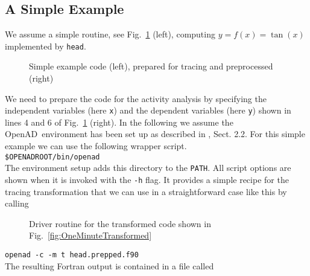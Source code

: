 \documentclass{article}
\newcommand{\openad}{OpenAD}
\newcommand{\reffig}[1]{{Fig.~\ref{#1}}}
\begin{document}
\subsection{A Simple Example}
We assume a simple routine, see \reffig{fig:OneMinute} (left), computing $y=f(x)=\tan(x)$ implemented by \lstinline{head}.
\begin{figure}
\begin{minipage}[t]{.48\linewidth}

\end{minipage}
\begin{minipage}[t]{.48\linewidth}

\end{minipage}
\caption{Simple example code (left), prepared for tracing and preprocessed (right)}\label{fig:OneMinute}
\end{figure}
We need to prepare the code for the activity analysis by specifying the independent variables
(here \lstinline{x}) and the dependent variables 
(here \lstinline{y}) shown in lines 4 and 6 of \reffig{fig:OneMinute} (right).
In the following we assume the \openad\ environment has been set up as 
described in \cite{userManual}, Sect. 2.2.
For this simple example we can use the following wrapper script.\\[1ex]
\hspace*{.3cm}\lstinline{$OPENADROOT/bin/openad}\\[1ex] %
The environment setup adds this directory to the \lstinline{PATH}.
All script options are shown when it is invoked with the \lstinline{-h} flag. 
It provides a simple recipe for the tracing transformation that we can use in 
a straightforward case like this by calling %
\begin{wrapfigure}[25]{r}{.5\textwidth}
\begin{minipage}{.98\linewidth}

\end{minipage}
\caption{Driver routine for the transformed code  shown in \reffig{fig:OneMinuteTransformed} }\label{fig:OneMinuteDriver}
\end{wrapfigure}
\hspace*{.3cm}\lstinline{openad -c -m t head.prepped.f90}\\[1ex]
The resulting Fortran output is contained in a file called\\[1ex]
\end{document}
